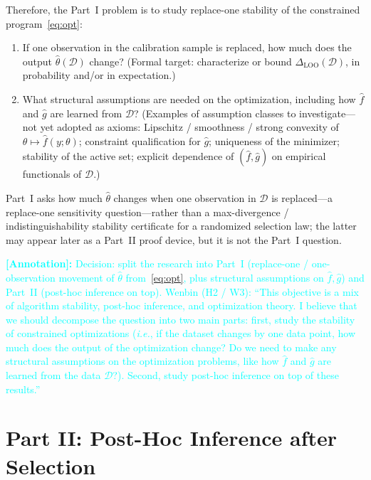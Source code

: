 \documentclass[12pt]{article}
\theoremstyle{plain}
\newcommand*{\ie}{\emph{i.e.}{}}
\newcommand{\annote}[1]{\textcolor{cyan}{\textbf{[Annotation]:} #1}}
\begin{document}
\label{prob:part-i}
Therefore, the Part~I problem is to study replace-one stability of the constrained program~\eqref{eq:opt}:
\begin{enumerate}[leftmargin=*]
  \item\label{prob:part-i-1}
        If one observation in the calibration sample is replaced, how much does the output $\hat\theta(\mathcal{D})$ change?
        (Formal target: characterize or bound $\Delta_{\mathrm{LOO}}(\mathcal{D})$, in probability and/or in expectation.)
  \item\label{prob:part-i-2}
        What structural assumptions are needed on the optimization, including how $\hat f$ and $\hat g$ are learned from $\mathcal{D}$?
        (Examples of assumption classes to investigate---not yet adopted as axioms:
        Lipschitz / smoothness / strong convexity of $\theta\mapsto\hat f(y;\theta)$;
        constraint qualification for $\hat g$;
        uniqueness of the minimizer;
        stability of the active set;
        explicit dependence of $(\hat f,\hat g)$ on empirical functionals of $\mathcal{D}$.)
\end{enumerate}
\label{rem:LOO-vs-ZJ}
Part~I asks how much $\hat\theta$ changes when one observation in $\mathcal{D}$ is replaced---a replace-one sensitivity question---rather than a max-divergence / indistinguishability stability certificate for a randomized selection law; the latter may appear later as a Part~II proof device, but it is not the Part~I question.

\annote{Decision: split the research into Part~I (replace-one / one-observation movement of $\hat\theta$ from~\eqref{eq:opt}, plus structural assumptions on $\hat f,\hat g$) and Part~II (post-hoc inference on top).
Wenbin (H2 / W3): ``This objective is a mix of algorithm stability, post-hoc inference, and optimization theory. I believe that we should decompose the question into two main parts: first, study the stability of constrained optimizations (\ie, if the dataset changes by one data point, how much does the output of the optimization change? Do we need to make any structural assumptions on the optimization problems, like how $\hat f$ and $\hat g$ are learned from the data $\mathcal{D}$?). Second, study post-hoc inference on top of these results.''}

\section{Part II: Post-Hoc Inference after Selection}
\label{sec:part-ii}
\end{document}
